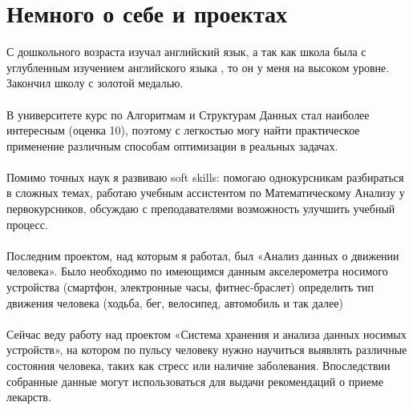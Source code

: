 \documentclass[11pt,a4paper,sans]{moderncv}
\begin{document}
\section{Немного о себе и проектах}
С дошкольного возраста изучал английский язык, а так как школа была с углубленным изучением английского языка , то он у меня на высоком уровне. Закончил школу с золотой медалью.
\\\\
В университете курс по Алгоритмам и Структурам Данных стал наиболее интересным (оценка 10), поэтому с легкостью могу найти практическое применение различным способам оптимизации в реальных задачах.
\\\\
Помимо точных наук я развиваю soft skills: помогаю однокурсникам разбираться в сложных темах, работаю учебным ассистентом по Математическому Анализу у первокурсников, обсуждаю с преподавателями возможность улучшить учебный процесс. 
\\\\
Последним проектом, над которым я работал, был «Анализ данных о движении человека». Было необходимо по имеющимся данным акселерометра носимого устройства (смартфон, электронные часы, фитнес-браслет) определить тип движения человека (ходьба, бег, велосипед, автомобиль и так далее)
\\\\
Сейчас веду работу над проектом «Система хранения и анализа данных носимых устройств», на котором по пульсу человеку нужно научиться выявлять различные состояния человека, таких как стресс или наличие заболевания. Впоследствии собранные данные могут использоваться для выдачи рекомендаций о приеме лекарств. 

	
\end{document}
